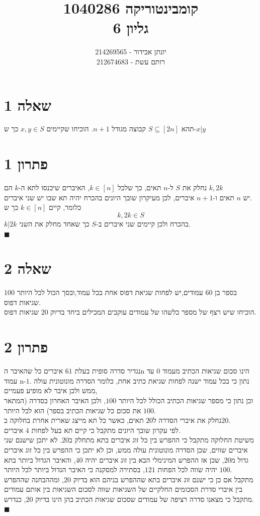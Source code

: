 \documentclass[12pt, titlepage]{article}
\title{קומבינטוריקה 1040286 \\ גליון 6}
\author{יונתן אבידור - 214269565\\רותם עשת - 212674683}
\begin{document}
\maketitle
\pagestyle{fancy}
\fancyhead{}
\part*{שאלה 1}
תהא $S\subseteq \left[2n\right]$ קבוצה מגודל $n+1$. הוכיחו שקיימים $x,y\in S$ כך ש-$x|y$
\part*{פתרון 1}
נחלק את $S$ ל-$n$ תאים, כך שלכל $k\in\left[n\right]$, האיברים שיכנסו לתא ה-$k$ הם $k,2k$\\
יש $n$ תאים ו-$n+1$ איברים, לכן מעיקרון שובך היונים בהכרח יהיה תא שבו יש שני איברים.\\
כלומר, קיים $k\in\left[n\right]$ כך ש
\[
	k,  2 k \in S
\] $k|2k$ בהכרח ולכן קיימים שני איברים ב-$S$ כך שאחד מחלק את השני.\\
$\blacksquare$
\newpage
\part*{שאלה 2}
בספר בן $60$ עמודים,יש לפחות שגיאת דפוס אחת בכל עמוד,ובסך הכול לכל היותר $100$ שגיאות דפוס.\\
הוכיחו שיש רצף של מספר כלשהו של עמודים עוקבים המכילים ביחד בדיוק $20$ שגיאות דפוס.
\part*{פתרון 2}
נגדיר סדרה סופית בעלת $61$ איברים כל שהאיבר הn הינו סכום שגיאות הכתיב מעמוד $0$ עד עמוד n-$1$. נתון כי בכל עמוד ישנה לפחות שגיאת כתיב אחת, כלומר הסדרה מונוטונית עולה ממש ולכן איבר לא מופיע פעמיים,\\
וכן נתון כי מספר שגיאות הכתיב הכולל לכל היותר $100$, ולכן האיבר האחרון בסדרה (המתאר את סכום כל שגיאות הכתיב בספר) הוא לכל היותר $100$.\\
נחלק את איברי הסדרה ל$20$ תאים, כאשר כל תא מייצג שארית אחרת בחלוקה ב$20$.\\
לפי עקרון שובך היונים מתקבל כי קיים תא בעל לפחות $4$ איברים.\\
משיטת החלוקה מתקבל כי ההפרש בין כל זוג איברים בתא מתחלק ב$20$. לא יתכן שישנם שני איברים שווים, שכן הסדרה מונוטונית עולה ממש, וכן לא יתכן כי ההפרש בין כל זוג איברים גדול מ$20$, שכן אז ההפרש המינימלי הבא בין זוג איברים יהיה $40$, והאיבר הגדול ביותר בתא יהיה שווה לכל הפחות $121$, בסתירה למסקנה כי האיבר הגדול ביותר לכל היותר $100$.\\
מתקבל אם כן כי ישנם זוג איברים בתא שההפרש בניהם הוא בדיוק $20$, ומההבחנה שההפרש בין איברי סדרת הסכומים החלקיים של השגיאות שווה לסכום השגיאות בין אותם עמודים מתקבל כי מצאנו סדרה רציפה של עמודים שסכום שגיאות הכתיב בהן הינו בדיוק $20$, כנדרש.\\
$\blacksquare$
\newpage
\end{document}
